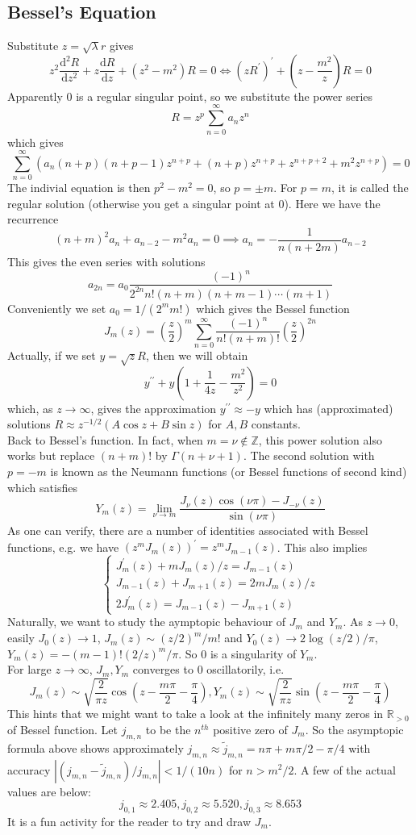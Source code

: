 \subsection{Bessel's Equation}
Substitute $z=\sqrt{\lambda}r$ gives
$$z^2\frac{\mathrm d^2R}{\mathrm dz^2}+z\frac{\mathrm dR}{\mathrm dz}+(z^2-m^2)R=0\iff (zR^\prime)^\prime+\left( z-\frac{m^2}{z} \right)R=0$$
Apparently $0$ is a regular singular point, so we substitute the power series
$$R=z^p\sum_{n=0}^\infty a_nz^n$$
which gives
$$\sum_{n=0}^\infty (a_n(n+p)(n+p-1)z^{n+p}+(n+p)z^{n+p}+z^{n+p+2}+m^2z^{n+p})=0$$
The indivial equation is then $p^2-m^2=0$, so $p=\pm m$.
For $p=m$, it is called the regular solution (otherwise you get a singular point at $0$).
Here we have the recurrence
$$(n+m)^2a_n+a_{n-2}-m^2a_n=0\implies a_n=-\frac{1}{n(n+2m)}a_{n-2}$$
This gives the even series with solutions
$$a_{2n}=a_0\frac{(-1)^n}{2^{2n}n!(n+m)(n+m-1)\cdots (m+1)}$$
Conveniently we set $a_0=1/(2^mm!)$ which gives the Bessel function
$$J_m(z)=\left( \frac{z}{2} \right)^m\sum_{n=0}^\infty\frac{(-1)^n}{n!(n+m)!}\left( \frac{z}{2} \right)^{2n}$$
Actually, if we set $y=\sqrt{z}R$, then we will obtain
$$y^{\prime\prime}+y\left( 1+\frac{1}{4z}-\frac{m^2}{z^2} \right)=0$$
which, as $z\to\infty$, gives the approximation $y^{\prime\prime}\approx -y$ which has (approximated) solutions $R\approx z^{-1/2}(A\cos z+B\sin z)$ for $A,B$ constants.\\
Back to Bessel's function.
In fact, when $m=\nu\notin\mathbb Z$, this power solution also works but replace $(n+m)!$ by $\Gamma(n+\nu+1)$.
The second solution with $p=-m$ is known as the Neumann functions (or Bessel functions of second kind) which satisfies
$$Y_m(z)=\lim_{\nu\to m}\frac{J_\nu(z)\cos(\nu\pi)-J_{-\nu}(z)}{\sin(\nu\pi)}$$
As one can verify, there are a number of identities associated with Bessel functions, e.g. we have $(z^mJ_m(z))^\prime=z^mJ_{m-1}(z)$.
This also implies
$$\begin{cases}
    J_m^\prime(z)+mJ_m(z)/z=J_{m-1}(z)\\
    J_{m-1}(z)+J_{m+1}(z)=2mJ_m(z)/z\\
    2J_m^\prime(z)=J_{m-1}(z)-J_{m+1}(z)
\end{cases}$$
Naturally, we want to study the aymptopic behaviour of $J_m$ and $Y_m$.
As $z\to 0$, easily $J_0(z)\to 1$, $J_m(z)\sim (z/2)^m/m!$ and $Y_0(z)\to 2\log(z/2)/\pi$, $Y_m(z)=-(m-1)!(2/z)^m/\pi$.
So $0$ is a singularity of $Y_m$.\\
For large $z\to\infty$, $J_m,Y_m$ converges to $0$ oscillatorily, i.e.
$$J_m(z)\sim\sqrt{\frac{2}{\pi z}}\cos\left( z-\frac{m\pi}{2}-\frac{\pi}{4} \right),Y_m(z)\sim\sqrt{\frac{2}{\pi z}}\sin\left( z-\frac{m\pi}{2}-\frac{\pi}{4} \right)$$
This hints that we might want to take a look at the infinitely many zeros in $\mathbb R_{>0}$ of Bessel function.
Let $j_{m,n}$ to be the $n^{th}$ positive zero of $J_m$.
So the asymptopic formula above shows approximately $j_{m,n}\approx \tilde{j}_{m,n}=n\pi +m\pi/2-\pi/4$ with accuracy $|(j_{m,n}-\tilde{j}_{m,n})/j_{m,n}|<1/(10n)$ for $n>m^2/2$.
A few of the actual values are below:
$$j_{0,1}\approx 2.405,j_{0,2}\approx 5.520,j_{0,3}\approx 8.653$$
It is a fun activity for the reader to try and draw $J_m$.
